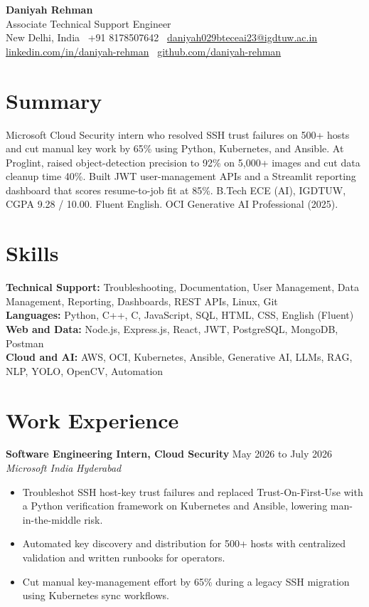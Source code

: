 \documentclass[a4paper,10pt]{article}
\newcommand{\entry}[4]{%
  \vspace{3pt}%
  \noindent\textbf{#1} \hfill #2\\[0.4pt]
  \textit{#3} \hfill \textit{#4}\par
  \vspace{1pt}%
}
\begin{document}
\small

\begin{center}
  {\LARGE\bfseries Daniyah Rehman}\\[4pt]
  Associate Technical Support Engineer\\[4pt]
  New Delhi, India \textbar\ +91 8178507642 \textbar\
  \href{mailto:daniyah029bteceai23@igdtuw.ac.in}{daniyah029bteceai23@igdtuw.ac.in}\\[2pt]
  \href{https://www.linkedin.com/in/daniyah-rehman}{linkedin.com/in/daniyah-rehman} \textbar\
  \href{https://github.com/daniyah-rehman}{github.com/daniyah-rehman}
\end{center}

\section{Summary}
Microsoft Cloud Security intern who resolved SSH trust failures on 500+ hosts and cut manual key work by 65\% using Python, Kubernetes, and Ansible. At Proglint, raised object-detection precision to 92\% on 5,000+ images and cut data cleanup time 40\%. Built JWT user-management APIs and a Streamlit reporting dashboard that scores resume-to-job fit at 85\%. B.Tech ECE (AI), IGDTUW, CGPA 9.28 / 10.00. Fluent English. OCI Generative AI Professional (2025).

\section{Skills}
\noindent\textbf{Technical Support:} Troubleshooting, Documentation, User Management, Data Management, Reporting, Dashboards, REST APIs, Linux, Git\\[2pt]
\textbf{Languages:} Python, C++, C, JavaScript, SQL, HTML, CSS, English (Fluent)\\[2pt]
\textbf{Web and Data:} Node.js, Express.js, React, JWT, PostgreSQL, MongoDB, Postman\\[2pt]
\textbf{Cloud and AI:} AWS, OCI, Kubernetes, Ansible, Generative AI, LLMs, RAG, NLP, YOLO, OpenCV, Automation

\section{Work Experience}
\entry{Software Engineering Intern, Cloud Security}{May 2026 to July 2026}
{Microsoft India}{Hyderabad}
\begin{itemize}
  \item Troubleshot SSH host-key trust failures and replaced Trust-On-First-Use with a Python verification framework on Kubernetes and Ansible, lowering man-in-the-middle risk.
  \item Automated key discovery and distribution for 500+ hosts with centralized validation and written runbooks for operators.
  \item Cut manual key-management effort by 65\% during a legacy SSH migration using Kubernetes sync workflows.
\end{itemize}
\end{document}
